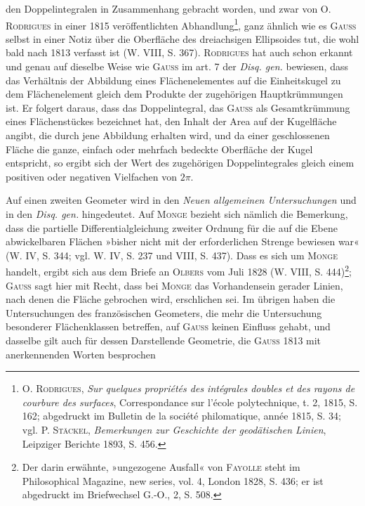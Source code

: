 den Doppelintegralen in Zusammenhang gebracht worden, und zwar von \textsc{O. Rodrigues}
in einer 1815 veröffentlichten Abhandlung\footnote{\textsc{O. Rodrigues}, \textit{Sur quelques propriétés des intégrales doubles et des rayons de courbure des surfaces}, Correspondance sur l’école polytechnique, t. 2, 1815, S. 162; abgedruckt im Bulletin de la société philomatique, année 1815, S. 34; vgl. \textsc{P. Stäckel}, \textit{Bemerkungen zur Geschichte der geodätischen Linien}, Leipziger Berichte 1893, S. 456.}, ganz ähnlich wie es \textsc{Gauss}
selbst in einer Notiz über die Oberfläche des dreiachsigen Ellipsoides tut,
die wohl bald nach 1813 verfasst ist (W. VIII, S. 367). \textsc{Rodrigues} hat auch
schon erkannt und genau auf dieselbe Weise wie \textsc{Gauss} im art. 7 der \textit{Disq.
gen.} bewiesen, dass das Verhältnis der Abbildung eines Flächenelementes auf
die Einheitskugel zu dem Flächenelement gleich dem Produkte der zugehörigen
Hauptkrümmungen ist. Er folgert daraus, dass das Doppelintegral, das \textsc{Gauss}
als Gesamtkrümmung eines Flächenstückes bezeichnet hat, den Inhalt der
Area auf der Kugelfläche angibt, die durch jene Abbildung erhalten wird, und
da einer geschlossenen Fläche die ganze, einfach oder mehrfach bedeckte
Oberfläche der Kugel entspricht, so ergibt sich der Wert des zugehörigen
Doppelintegrales gleich einem positiven oder negativen Vielfachen von \(2\pi\).
\par
Auf einen zweiten Geometer wird in den \textit{Neuen allgemeinen Untersuchungen}
und in den \textit{Disq. gen.} hingedeutet. Auf \textsc{Monge} bezieht sich nämlich
die Bemerkung, dass die partielle Differentialgleichung zweiter Ordnung
für die auf die Ebene abwickelbaren Flächen »bisher nicht mit der erforderlichen
Strenge bewiesen war« (W. IV, S. 344; vgl. W. IV, S. 237 und VIII,
S. 437). Dass es sich um \textsc{Monge} handelt, ergibt sich aus dem Briefe an
\textsc{Olbers} vom Juli 1828 (W. VIII, S. 444)\footnote{Der darin erwähnte, »ungezogene Ausfall« von \textsc{Fayolle} steht im Philosophical Magazine, new series, vol. 4, London 1828, S. 436; er ist abgedruckt im Briefwechsel G.-O., 2, S. 508.}; \textsc{Gauss} sagt hier mit Recht, dass
bei \textsc{Monge} das Vorhandensein gerader Linien, nach denen die Fläche gebrochen
wird, erschlichen sei. Im übrigen haben die Untersuchungen des französischen
Geometers, die mehr die Untersuchung besonderer Flächenklassen betreffen,
auf \textsc{Gauss} keinen Einfluss gehabt, und dasselbe gilt auch für dessen Darstellende
Geometrie, die \textsc{Gauss} 1813 mit anerkennenden Worten besprochen
